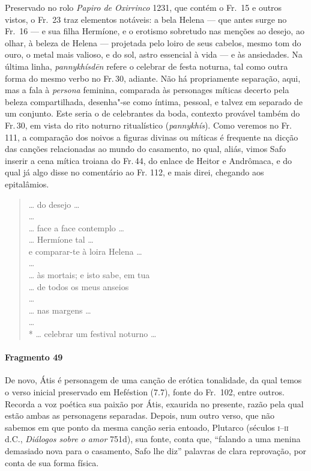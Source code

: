 {{\small Preservado no rolo \textit{Papiro de Oxirrinco} 1231, que contém o Fr.~15 e outros vistos, o Fr.~23 traz elementos notáveis: a bela Helena --- que antes surge no Fr.~16 --- e sua filha Hermíone, e o erotismo sobretudo nas menções ao desejo, ao olhar, à beleza de Helena --- projetada pelo loiro de seus cabelos, mesmo tom do ouro, o metal mais valioso, e do sol, astro essencial à vida --- e às ansiedades. Na última linha, \textit{pannykhísdēn} refere o celebrar de festa noturna, tal como outra forma do mesmo verbo no Fr.\,30, adiante. Não há propriamente separação, aqui, mas a fala à \textit{persona} feminina, comparada às personages míticas decerto pela beleza compartilhada, desenha"-se como íntima, pessoal, e talvez em separado de um conjunto. Este seria o de celebrantes da boda, contexto provável também do Fr.\,30, em vista do rito noturno ritualístico (\textit{pannykhís}). Como veremos no Fr.\,111, a comparação dos noivos a figuras divinas ou míticas é frequente na dicção das canções relacionadas ao mundo do casamento, no qual, aliás, vimos Safo inserir a cena mítica troiana do Fr.\,44, do enlace de Heitor e Andrômaca, e do qual já algo disse no comentário ao Fr. 112, e mais direi, chegando aos epitalâmios.}

\begin{verse}
\ldots{} do desejo \ldots{}\\
\ldots{}\\
\ldots{} face a face contemplo \ldots{}\\
\ldots{} Hermíone tal \ldots{}\\
e comparar-te à loira Helena \ldots{}\\
\ldots{}\\
\ldots{} às mortais; e isto sabe, em tua\\
\ldots{} de todos os meus anseios\\
\ldots{}\\
\ldots{} nas margens \ldots{}\\
\ldots{}\\*
\ldots{} celebrar um festival noturno \ldots{} 
\end{verse}

\paragraph{Fragmento 49}

{\small De novo, Átis é personagem de uma canção de erótica tonalidade, da qual temos o verso inicial preservado em Heféstion (7.7), fonte do Fr.~102, entre outros. Recorda a voz poética sua paixão por Átis, exaurida no presente, razão pela qual estão ambas as personagens separadas. Depois, num outro verso, que não sabemos em que ponto da mesma canção seria entoado, Plutarco (séculos \textsc{i}--\textsc{ii} d.C., \textit{Diálogos sobre o amor} 751d),
sua fonte, conta que, “falando a uma menina demasiado nova para o
casamento, Safo lhe diz” palavras de clara reprovação, por conta de sua forma
física. }

}
